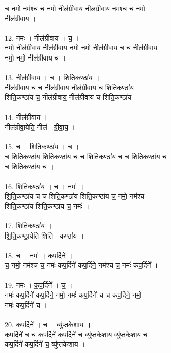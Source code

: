 च॒ नमो॒ नम॑श्च च॒ नमो॒ नील॑ग्रीवाय॒ नील॑ग्रीवाय॒ नम॑श्च च॒ नमो॒\\
नील॑ग्रीवाय ।\\
\\
12. नमः॑ । नील॑ग्रीवाय । च॒ ।\\
नमो॒ नील॑ग्रीवाय॒ नील॑ग्रीवाय॒ नमो॒ नमो॒ नील॑ग्रीवाय च च॒ नील॑ग्रीवाय॒\\
नमो॒ नमो॒ नील॑ग्रीवाय च ।\\
\\
13. नील॑ग्रीवाय । च॒ । शि॒ति॒कण्ठा॑य ।\\
नील॑ग्रीवाय च च॒ नील॑ग्रीवाय॒ नील॑ग्रीवाय च शिति॒कण्ठा॑य\\
शिति॒कण्ठा॑य च॒ नील॑ग्रीवाय॒ नील॑ग्रीवाय च शिति॒कण्ठा॑य ।\\
\\
14. नील॑ग्रीवाय ।\\
नील॑ग्रीवा॒येति॒ नील॑ - ग्री॒वा॒य॒ ।\\
\\
15. च॒ । शि॒ति॒कण्ठा॑य । च॒ ।\\
च॒ शि॒ति॒कण्ठा॑य शिति॒कण्ठा॑य च च शिति॒कण्ठा॑य च च शिति॒कण्ठा॑य च\\
च शिति॒कण्ठा॑य च ।\\
\\
16. शि॒ति॒कण्ठा॑य । च॒ । नमः॑ ।\\
शि॒ति॒कण्ठा॑य च च शिति॒कण्ठा॑य शिति॒कण्ठा॑य च॒ नमो॒ नम॑श्च\\
शिति॒कण्ठा॑य शिति॒कण्ठा॑य च॒ नमः॑ ।\\
\\
17. शि॒ति॒कण्ठा॑य ।\\
शि॒ति॒कण्ठा॒येति॑ शिति - कण्ठा॑य ।\\
\\
18. च॒ । नमः॑ । क॒प॒र्दिने᳚ ।\\
च॒ नमो॒ नम॑श्च च॒ नमः॑ कप॒र्दिने॑ कप॒र्दिने॒ नम॑श्च च॒ नमः॑ कप॒र्दिने᳚ ।\\
\\
19. नमः॑ । क॒प॒र्दिने᳚ । च॒ ।\\
नमः॑ कप॒र्दिने॑ कप॒र्दिने॒ नमो॒ नमः॑ कप॒र्दिने॑ च च कप॒र्दिने॒ नमो॒\\
नमः॑ कप॒र्दिने॑ च ।\\
\\
20. क॒प॒र्दिने᳚ । च॒ । व्यु॑प्तकेशाय ।\\
क॒प॒र्दिने॑ च च कप॒र्दिने॑ कप॒र्दिने॑ च॒ व्यु॑प्तकेशाय॒ व्यु॑प्तकेशाय च\\
कप॒र्दिने॑ कप॒र्दिने॑ च॒ व्यु॑प्तकेशाय ।\\
\\
